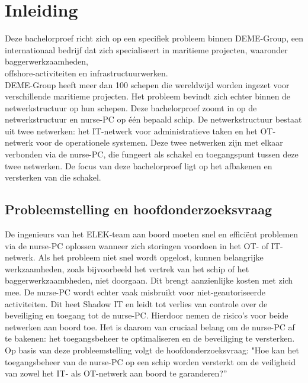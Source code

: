 


% 

\section{Inleiding}%
\label{sec:inleiding}
Deze bachelorproef richt zich op een specifiek probleem binnen DEME-Group, een internationaal bedrijf dat zich specialiseert in maritieme projecten, waaronder 
baggerwerkzaamheden, \\offshore-activiteiten en infrastructuurwerken. \\DEME-Group heeft meer dan 100 schepen die wereldwijd worden ingezet voor verschillende maritieme projecten. Het probleem 
bevindt zich echter binnen de netwerkstructuur op hun schepen. Deze bachelorproef zoomt in op de netwerkstructuur en nurse-PC op één bepaald schip. De netwerkstructuur bestaat uit twee netwerken: het IT-netwerk voor administratieve taken 
en het OT-netwerk voor de operationele systemen. Deze twee netwerken zijn met elkaar verbonden via de nurse-PC, 
die fungeert als schakel en toegangspunt tussen deze twee netwerken. De focus van deze bachelorproef ligt op het afbakenen en versterken van die schakel.

\subsection{Probleemstelling en hoofdonderzoeksvraag}
De ingenieurs van het ELEK-team aan boord moeten snel en efficiënt problemen via de nurse-PC oplossen wanneer zich storingen voordoen in het OT- of IT-netwerk.  
Als het probleem niet snel wordt opgelost, kunnen belangrijke werkzaamheden, zoals bijvoorbeeld het vertrek van het schip of het baggerwerkzaambheden, niet doorgaan. 
Dit brengt aanzienlijke kosten met zich mee. De nurse-PC wordt echter vaak misbruikt voor niet-geautoriseerde activiteiten. Dit heet Shadow IT en leidt tot verlies van controle 
over de beveiliging en toegang tot de nurse-PC. Hierdoor nemen de risico’s voor beide netwerken aan boord toe. Het is daarom van cruciaal belang om de nurse-PC af 
te bakenen: het toegangsbeheer te optimaliseren en de beveiliging te versterken. Op basis van deze probleemstelling volgt de hoofdonderzoeksvraag: 
"Hoe kan het toegangsbeheer van de nurse-PC op een schip worden versterkt om de veiligheid van zowel het IT- als OT-netwerk aan boord te garanderen?” 

